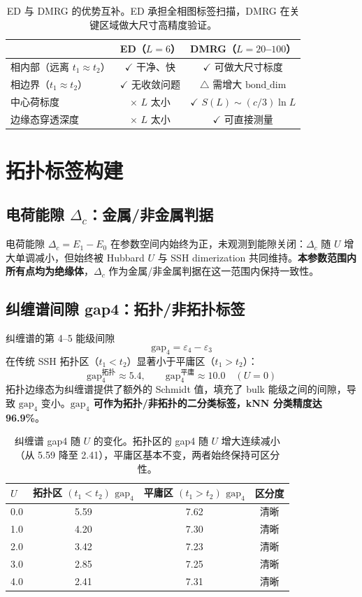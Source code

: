 \documentclass[11pt,a4paper]{article}
\begin{document}
\begin{table}[ht]
\centering
\begin{tabular}{lcc}
\toprule
 & ED（$L=6$） & DMRG（$L=20$--$100$） \\
\midrule
相内部（远离 $t_1\approx t_2$） & $\checkmark$ 干净、快 & $\checkmark$ 可做大尺寸标度 \\
相边界（$t_1\approx t_2$） & $\checkmark$ 无收敛问题 & $\triangle$ 需增大 $\mathrm{bond\_dim}$ \\
中心荷标度 & $\times$ $L$ 太小 & $\checkmark$ $S(L)\sim (c/3)\ln L$ \\
边缘态穿透深度 & $\times$ $L$ 太小 & $\checkmark$ 可直接测量 \\
\bottomrule
\end{tabular}
\caption{ED 与 DMRG 的优势互补。ED 承担全相图标签扫描，DMRG 在关键区域做大尺寸高精度验证。}
\label{tab:comp}
\end{table}

\section{拓扑标签构建}

\subsection{电荷能隙 $\Delta_c$：金属/非金属判据}

电荷能隙 $\Delta_c = E_1 - E_0$ 在参数空间内始终为正，未观测到能隙关闭：$\Delta_c$ 随 $U$ 增大单调减小，但始终被 Hubbard $U$ 与 SSH dimerization 共同维持。\textbf{本参数范围内所有点均为绝缘体}，$\Delta_c$ 作为金属/非金属判据在这一范围内保持一致性。

\subsection{纠缠谱间隙 gap4：拓扑/非拓扑标签}

纠缠谱的第 4--5 能级间隙
\[
\mathrm{gap}_4 = \varepsilon_4 - \varepsilon_3
\]
在传统 SSH 拓扑区（$t_1 < t_2$）显著小于平庸区（$t_1 > t_2$）：
\[
\mathrm{gap}_4^{\text{拓扑}} \approx 5.4,\qquad
\mathrm{gap}_4^{\text{平庸}} \approx 10.0 \quad (U=0)
\]
拓扑边缘态为纠缠谱提供了额外的 Schmidt 值，填充了 bulk 能级之间的间隙，导致 $\mathrm{gap}_4$ 变小。\textbf{$\mathrm{gap}_4$ 可作为拓扑/非拓扑的二分类标签，kNN 分类精度达 96.9\%}。

\begin{table}[ht]
\centering
\begin{tabular}{lccc}
\toprule
$U$ & 拓扑区 $(t_1<t_2)$ $\mathrm{gap}_4$ & 平庸区 $(t_1>t_2)$ $\mathrm{gap}_4$ & 区分度 \\
\midrule
0.0 & 5.59 & 7.62 & 清晰 \\
1.0 & 4.20 & 7.30 & 清晰 \\
2.0 & 3.42 & 7.23 & 清晰 \\
3.0 & 2.85 & 7.25 & 清晰 \\
4.0 & 2.41 & 7.31 & 清晰 \\
\bottomrule
\end{tabular}
\caption{纠缠谱 gap4 随 $U$ 的变化。拓扑区的 gap4 随 $U$ 增大连续减小（从 5.59 降至 2.41），平庸区基本不变，两者始终保持可区分性。}
\label{tab:gap4}
\end{table}
\end{document}
